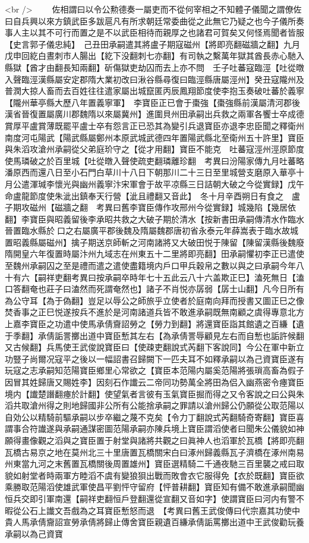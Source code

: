 <br />
　　佐相謂曰以令公勲德奏一屬吏而不從何宰相之不知體子儀聞之謂僚佐曰自兵興以來方鎮武臣多跋扈凡有所求朝廷常委曲從之此無它乃疑之也今子儀所奏事人主以其不可行而置之是不以武臣相待而親厚之也諸君可賀矣又何怪焉聞者皆服【史言郭子儀忠純】　己丑田承嗣遣其將盧子期寇磁州【將即亮翻磁牆之翻】九月戊申回紇白晝刺市人腸出【紇下没翻刺七亦翻】有司執之繫萬年獄其酋長赤心馳入縣獄【酋才由翻長知兩翻】斫傷獄吏劫囚而去上亦不問　壬子吐蕃寇臨涇【吐從暾入聲臨涇漢縣屬安定郡隋大業初改曰湫谷縣尋復曰臨涇縣唐屬涇州】癸丑寇隴州及普潤大掠人畜而去百姓往往遣家屬出城竄匿丙辰鳳翔節度使李抱玉奏破吐蕃於義寧【隴州華亭縣大歷八年置義寧軍】　李寶臣正已會于棗強【棗強縣前漢屬清河郡後漢省晉復置屬廣川郡魏隋以來屬冀州】進圍貝州田承嗣出兵救之兩軍各饗士卒成德賞厚平盧賞薄既罷平盧士卒有怨言正已恐其為變引兵退寶臣亦退李忠臣聞之釋衛州南度河屯陽武【陽武縣屬鄭州本原武城武德四年置陽武縣北至衛州五十許里】寶臣與朱滔攻滄州承嗣從父弟庭玠守之【從才用翻】寶臣不能克　吐蕃寇涇州涇原節度使馬璘破之於百里城【吐從暾入聲使疏吏翻璘離珍翻　考異曰汾陽家傳九月吐蕃略潘原西而還八日至小石門白草川十八日下朝那川二十三日至里城營支磨原入華亭十月公遣渾瑊李懷光與幽州義寧汴宋軍會于故平凉縣三日詰朝大破之今從實録】戊午命盧龍節度使朱泚出鎮奉天行營【泚且禮翻又音此】　冬十月辛酉朔日有食之　盧子期攻磁州【磁牆之翻　考異曰舊李寶臣傳作攻邢州今從實録】城幾陷【幾居依翻】李寶臣與昭義留後李承昭共救之大破子期於清水【按新書田承嗣傳清水作臨水晉置臨水縣於口之右屬廣平郡後魏及隋屬魏郡唐初省永泰元年薛嵩表于臨水故城置昭義縣屬磁州】擒子期送京師斬之河南諸將又大破田悦于陳留【陳留漢縣後魏廢隋開皇六年復置時屬汴州九域志在州東五十二里將即亮翻】田承嗣懼初李正已遣使至魏州承嗣囚之至是禮而遣之遣使盡籍境内戶口甲兵穀帛之數以與之曰承嗣今年八十有六【嗣祥吏翻考異曰按承嗣卒時年七十五此云八十六盖欺正巳】溘死無日【溘口答翻奄也莊子曰溘然而死謂奄然也】諸子不肖悦亦孱弱【孱士山翻】凡今日所有為公守耳【為于偽翻】豈足以辱公之師旅乎立使者於庭南向拜而授書又圖正巳之像焚香事之正巳悦遂按兵不進於是河南諸道兵皆不敢進承嗣既無南顧之虞得專意北方上嘉李寶臣之功遣中使馬承倩齎詔勞之【勞力到翻】將還寶臣詣其館遺之百縑【遺于季翻】承倩詬詈擲出道中寶臣慙其左右【為承倩詈辱顧見左右而自慙也詬許候翻又古候翻】兵馬使王武俊說寶臣曰【使疎吏翻說式芮翻下客說同】今公在軍中新立功豎子尚爾况寇平之後以一幅詔書召歸闕下一匹夫耳不如釋承嗣以為己資寶臣遂有玩寇之志承嗣知范陽寶臣鄉里心常欲之【寶臣本范陽内屬奚范陽將張瑣高畜為假子因冒其姓歸唐又賜姓李】因刻石作䜟云二帝同功勢萬全將田為侣入幽燕密令瘞寶臣境内【䜟楚譖翻瘞於計翻】使望氣者言彼有玉氣寶臣掘而得之又令客說之曰公與朱滔共取滄州得之則地歸國非公所有公能捨承嗣之罪請以滄州歸公仍願從公取范陽以自効公以精騎前驅承嗣以步卒繼之蔑不克矣【令力丁翻說式芮翻騎奇寄翻】寶臣喜謂事合符䜟遂與承嗣通謀密圖范陽承嗣亦陳兵境上寶臣謂滔使者曰聞朱公儀貌如神願得畫像觀之滔與之寶臣置于射堂與諸將共觀之曰眞神人也滔軍於瓦橋【將即亮翻瓦橋古易京之地在莫州北三十里唐置瓦橋關宋白曰涿州歸義縣瓦子濟橋在涿州南易州東當九河之末舊置瓦橋關後周置雄州】寶臣選精騎二千通夜馳三百里襲之戒曰取貌如射堂者時兩軍方睦滔不虞有變狼狽出戰而敗會衣它服得免【衣於既翻】寶臣欲乘勝取范陽滔使雄武軍使昌平劉怦守留府【怦普耕翻】寶臣知有備不敢進承嗣聞幽恒兵交即引軍南還【嗣祥吏翻恒戶登翻還從宣翻又音如字】使謂寶臣曰河内有警不暇從公石上䜟文吾戲為之耳寶臣慙怒而退　【考異曰舊王武俊傳曰代宗嘉其功使中貴人馬承倩齎詔宣勞承倩將歸止傳舍寶臣親遺百縑承倩詬罵擲出道中王武俊勸玩養承嗣以為己資寶
